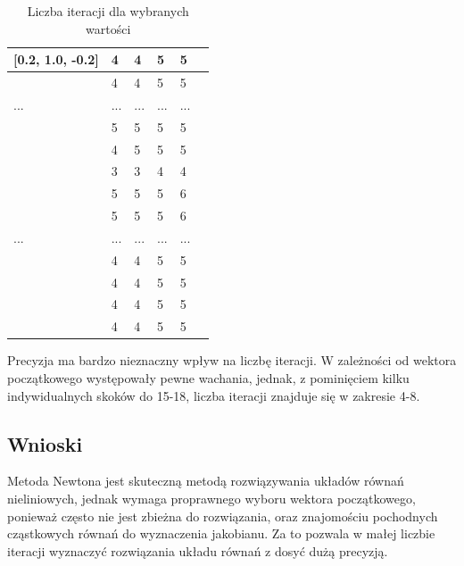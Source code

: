 \documentclass{article}
\begin{document}
\begin{table}[H]
\begin{tabular}{|l|l|l|l|l|l|}
    [0.2, 1.0, -0.2] & 4 & 4 & 5 & 5 \\ \hline
    [0.2, 1.0, 0.2] & 4 & 4 & 5 & 5 \\ \hline
    ... & ... & ... & ... & ...\\ \hline
    [0.6, 0.6, 1.0] & 5 & 5 & 5 & 5 \\ \hline
    [0.6, 1.0, -1.0] & 4 & 5 & 5 & 5 \\ \hline
    [0.6, 1.0, -0.6] & 3 & 3 & 4 & 4 \\ \hline
    [0.6, 1.0, -0.2] & 5 & 5 & 5 & 6 \\ \hline
    [0.6, 1.0, 0.2] & 5 & 5 & 5 & 6 \\ \hline
    ... & ... & ... & ... & ...\\ \hline
    [1.0, 1.0, -0.2] & 4 & 4 & 5 & 5 \\ \hline
    [1.0, 1.0, 0.2] & 4 & 4 & 5 & 5 \\ \hline
    [1.0, 1.0, 0.6] & 4 & 4 & 5 & 5 \\ \hline
    [1.0, 1.0, 1.0] & 4 & 4 & 5 & 5 \\ \hline
    \end{tabular}
    \caption{Liczba iteracji dla wybranych wartości}
    \end{table}

Precyzja ma bardzo nieznaczny wpływ na liczbę iteracji. W zależności od wektora początkowego występowały pewne wachania, jednak, z pominięciem
kilku indywidualnych skoków do 15-18, liczba iteracji znajduje się w zakresie 4-8.

\subsection{Wnioski}
Metoda Newtona jest skuteczną metodą rozwiązywania układów równań nieliniowych, jednak wymaga proprawnego wyboru wektora 
początkowego, ponieważ często nie jest zbieżna do rozwiązania, oraz znajomościu pochodnych cząstkowych równań do wyznaczenia jakobianu.
Za to pozwala w małej liczbie iteracji wyznaczyć rozwiązania układu równań z dosyć dużą precyzją.
\end{document}
